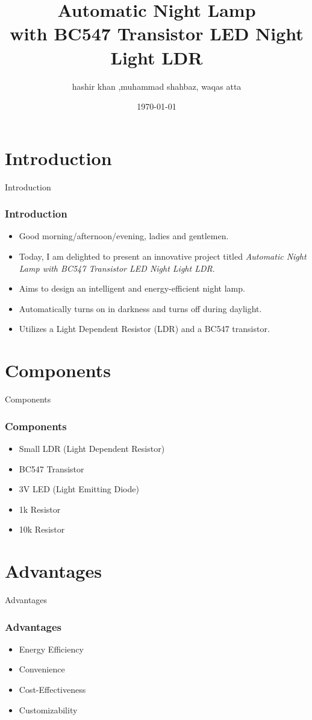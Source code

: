 \documentclass{beamer}
\title[Automatic Night Lamp]{Automatic Night Lamp\\with BC547 Transistor LED Night Light LDR}
\author[hashir khan]{hashir khan ,muhammad shahbaz, waqas atta}
\date{\today}
\begin{document}
\begin{frame}
  \titlepage
\end{frame}

\section{Introduction}
\begin{frame}{Introduction}
  \frametitle{Introduction}
  \begin{itemize}
    \item Good morning/afternoon/evening, ladies and gentlemen.
    \item Today, I am delighted to present an innovative project titled \textit{Automatic Night Lamp with BC547 Transistor LED Night Light LDR}.
    \item Aims to design an intelligent and energy-efficient night lamp.
    \item Automatically turns on in darkness and turns off during daylight.
    \item Utilizes a Light Dependent Resistor (LDR) and a BC547 transistor.
  \end{itemize}
\end{frame}

\section{Components}
\begin{frame}{Components}
  \frametitle{Components}
  \begin{itemize}
    \item Small LDR (Light Dependent Resistor)
    \item BC547 Transistor
    \item 3V LED (Light Emitting Diode)
    \item 1k Resistor
    \item 10k Resistor
  \end{itemize}
\end{frame}

\section{Advantages}
\begin{frame}{Advantages}
  \frametitle{Advantages}
  \begin{itemize}
    \item Energy Efficiency
    \item Convenience
    \item Cost-Effectiveness
    \item Customizability
  \end{itemize}
\end{frame}
\end{document}
